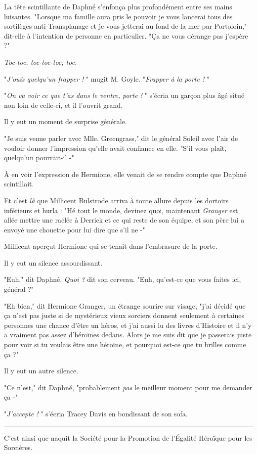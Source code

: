 La tête scintillante de Daphné s'enfonça plus profondément entre ses mains luisantes. "Lorsque ma famille aura pris le pouvoir je vous lancerai tous des sortilèges anti-Transplanage et je vous jetterai au fond de la mer par Portoloin," dit-elle à l'intention de personne en particulier. "Ça ne vous dérange pas j'espère ?"

\emph{Toc-toc, toc-toc-toc, toc.} 

"\emph{J'ouïs quelqu'un frapper !} " mugit M. Goyle. "\emph{Frapper à la porte !} "

"\emph{On va voir ce que t'as dans le ventre, porte !} " s'écria un garçon plus âgé situé non loin de celle-ci, et il l'ouvrit grand.

Il y eut un moment de surprise générale.

"Je suis venue parler avec Mlle. Greengrass," dit le général Soleil avec l'air de vouloir donner l'impression qu'elle avait confiance en elle. "S'il vous plaît, quelqu'un pourrait-il -"

À en voir l'expression de Hermione, elle venait de se rendre compte que Daphné scintillait.

Et c'est \emph{là}  que Millicent Bulstrode arriva à toute allure depuis les dortoirs inférieurs et hurla : "Hé tout le monde, devinez quoi, maintenant \emph{Granger}  est allée mettre une raclée à Derrick et ce qui reste de son équipe, et son père lui a envoyé une chouette pour lui dire que s'il ne -"

Millicent aperçut Hermione qui se tenait dans l'embrasure de la porte.

Il y eut un silence assourdissant.

"Euh," dit Daphné. \emph{Quoi ?}  dit son cerveau. "Euh, qu'est-ce que vous faites ici, général ?"

"Eh bien," dit Hermione Granger, un étrange sourire sur visage, "j'ai décidé que ça n'est pas juste si de mystérieux vieux sorciers donnent seulement à certaines personnes une chance d'être un héros, et j'ai aussi lu des livres d'Histoire et il n'y a vraiment pas assez d'héroïnes dedans. Alors je me suis dit que je passerais juste pour voir si tu voulais être une héroïne, et pourquoi est-ce que tu brilles comme ça ?"

Il y eut un autre silence.

"Ce n'est," dit Daphné, "probablement \emph{pas}  le meilleur moment pour me demander ça -"

"\emph{J'accepte !} " s'écria Tracey Davis en bondissant de son sofa.
\par\noindent\rule{\textwidth}{0.4pt}
C'est ainsi que naquit la Société pour la Promotion de l'Égalité Héroïque pour les Sorcières.

